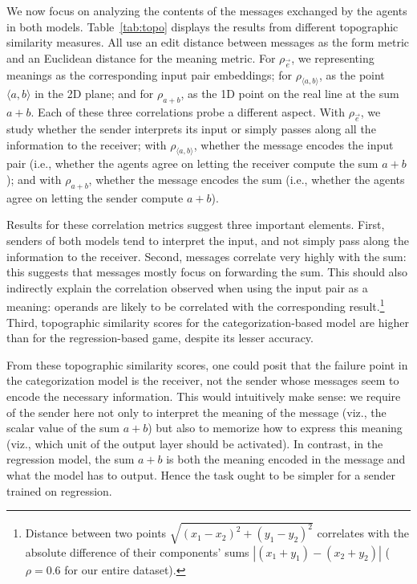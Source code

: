\documentclass[twocolumn]{article}
\begin{document}
We now focus on analyzing the contents of the messages exchanged by the agents in both models.
Table~\ref{tab:topo} displays the results from different topographic similarity measures. %
All use an edit distance between messages as the form metric and an Euclidean distance for the meaning metric.
For $\rho_{\vec{e}}$, we representing meanings as the corresponding input pair embeddings; for $\rho_{\langle a,b \rangle}$, as the point $\langle a,b \rangle$ in the 2D plane; and for $\rho_{a+b}$, as the 1D point on the real line at the sum $a+b$.
Each of these three correlations probe a different aspect.
With $\rho_{\vec{e}}$, we study whether the sender interprets its input or simply passes along all the information to the receiver; with $\rho_{\langle a,b \rangle}$, whether the message encodes the input pair (i.e., whether the agents agree on letting the receiver compute the sum $a+b$); and with $\rho_{a+b}$, whether the message encodes the sum (i.e., whether the agents agree on letting the sender compute $a+b$).

Results for these correlation metrics suggest three important elements.
First, senders of both models tend to interpret the input, and not simply pass along the information to the receiver.
Second, messages correlate very highly with the sum: this suggests that messages mostly focus on forwarding the sum.
This should also indirectly explain the correlation observed when using the input pair as a meaning: operands are likely to be correlated with the corresponding result.\footnote{
    Distance between two points $\sqrt{(x_1 - x_2)^2+(y_1- y_2 )^2}$ correlates with the absolute difference of their components' sums $|(x_1 + y_1) - (x_2 + y_2)|$ ($\rho=0.6$ for our entire dataset).
}
Third, topographic similarity scores for the categorization-based model are higher than for the regression-based game, despite its lesser accuracy. %

From these topographic similarity scores, one could posit that the failure point in the categorization model is the receiver, not the sender whose messages seem to encode the necessary information.
This would intuitively make sense: we require of the sender here not only to interpret the meaning of the message (viz., the scalar value of the sum $a+b$) but also to memorize how to express this meaning (viz., which unit of the output layer should be activated).
In contrast, in the regression model, the sum $a+b$ is both the meaning encoded in the message and what the model has to output.
Hence the task ought to be simpler for a sender trained on regression. 
\end{document}
